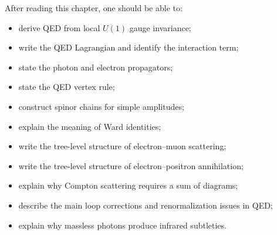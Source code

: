 After reading this chapter, one should be able to:
\begin{itemize}
    \item derive QED from local \(U(1)\) gauge invariance;
    \item write the QED Lagrangian and identify the interaction term;
    \item state the photon and electron propagators;
    \item state the QED vertex rule;
    \item construct spinor chains for simple amplitudes;
    \item explain the meaning of Ward identities;
    \item write the tree-level structure of electron--muon scattering;
    \item write the tree-level structure of electron--positron annihilation;
    \item explain why Compton scattering requires a sum of diagrams;
    \item describe the main loop corrections and renormalization issues in QED;
    \item explain why massless photons produce infrared subtleties.
\end{itemize}
